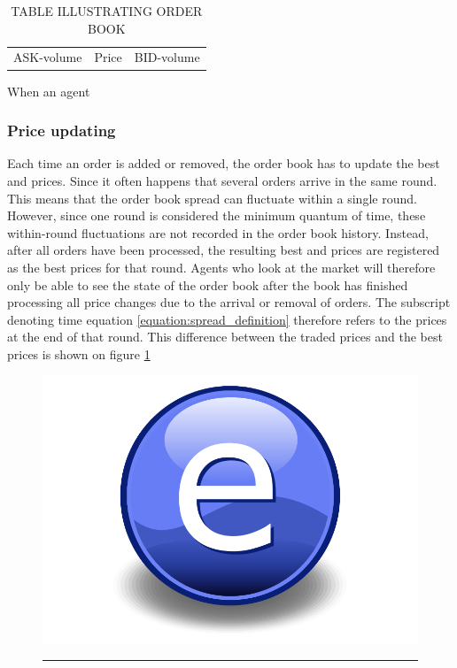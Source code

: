 \begin{table}
\centering
\begin{tabular}{ccc}
ASK-volume & Price & BID-volume
\end{tabular}
\caption{TABLE ILLUSTRATING ORDER BOOK}\label{table:example_order_book}
\end{table}

When an agent 

\subsubsection{Price updating}
Each time an order is added or removed, the order book has to update the best \bid{} and \ask{} prices. Since it often happens that several orders arrive in the same round. This means that the order book spread can fluctuate within a single round. However, since one round is considered the minimum quantum of time,  these within-round fluctuations are not recorded in the order book history. Instead, after all orders have been processed, the resulting best \bid{} and \ask{} prices are registered as the best prices for that round. Agents who look at the market will therefore only be able to see the state of the order book after the book has finished processing all price changes due to the arrival or removal of orders. The subscript denoting time equation \ref{equation:spread_definition} therefore refers to the prices at the end of that round. This difference between the traded prices and the best prices is shown on figure \ref{fig:within_round_price_fluctuations}

\begin{figure}[htbp]
	\centering
		\includegraphics{Figures/Electron.pdf}
		\rule{35em}{0.5pt}
	\caption{}
	\label{fig:within_round_price_fluctuations}
\end{figure}

